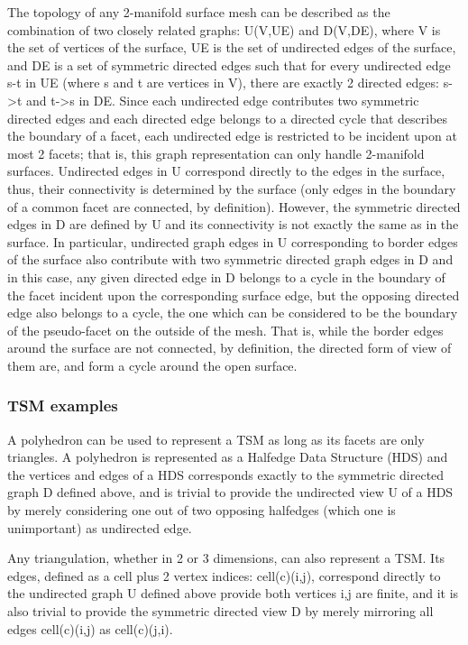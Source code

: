 The topology of any 2-manifold surface mesh can be described as the combination of two closely related graphs: U(V,UE) and D(V,DE), where V is the set of vertices of the surface, UE is the set of undirected edges of the surface, and DE is a set of symmetric directed edges such that for every undirected edge s-t in UE (where s and t are vertices in V), there are exactly 2 directed edges: s->t and t->s in DE.
Since each undirected edge contributes two symmetric directed edges and each directed edge belongs to a directed cycle that describes the boundary of a facet, each undirected edge is restricted to be incident upon at most 2 facets; that is, this graph representation can only handle 2-manifold surfaces. 
Undirected edges in U correspond directly to the edges in the surface, thus, their connectivity is determined by the surface (only edges in the boundary of a common facet are connected, by definition). However, the symmetric directed edges in D are defined by U and its connectivity is not exactly the same as in the surface. In particular, undirected graph edges in U corresponding to border edges of the surface also contribute with two symmetric directed graph edges in D and in this case, any given directed edge in D belongs to a cycle in the boundary of the facet incident upon the corresponding surface edge, but the opposing directed edge also belongs to a cycle, the one which can be considered to be the boundary of the pseudo-facet on the outside of the mesh. That is, while the border edges around the surface are not connected, by definition, the directed form of view of them are, and form a cycle around the open surface.

\subsubsection{TSM examples}

A polyhedron can be used to represent a TSM as long as its facets are only triangles. A polyhedron is represented as a Halfedge Data Structure (HDS) and the vertices and edges of a HDS corresponds exactly to the symmetric directed graph D defined above, and is trivial to provide the undirected view U of a HDS by merely considering one out of two opposing halfedges (which one is unimportant) as undirected edge.

Any triangulation, whether in 2 or 3 dimensions, can also represent a TSM. Its edges, defined as a cell plus 2 vertex indices: cell(c)(i,j), correspond directly to the undirected graph U defined above provide both vertices i,j are finite, and it is also trivial to provide the symmetric directed view D by merely mirroring all edges cell(c)(i,j) as cell(c)(j,i). 

